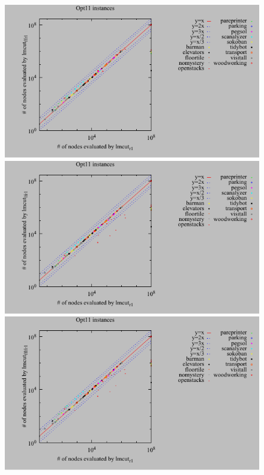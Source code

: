 \begin{figure}[htbp]
 \centering
 \includegraphics{tables/opt11-evaluated-lmcut_r-lmcut_ffr.pdf}
 \includegraphics{tables/opt11-evaluated-lmcut_r-lmcut_lfr.pdf}
 \includegraphics{tables/opt11-evaluated-lmcut_r-lmcut_fflfr.pdf}
 \caption{}
 \label{portfolio-r}
\end{figure}

